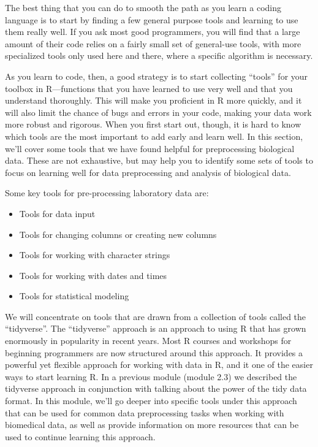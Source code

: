 \documentclass[]{tufte-book}
\providecommand{\tightlist}{%
  \setlength{\itemsep}{0pt}\setlength{\parskip}{0pt}}
\begin{document}
The best thing that you can do to smooth the path as you learn a coding language
is to start by finding a few general purpose tools and learning to use them
really well. If you ask most good programmers, you will find that a large
amount of their code relies on a fairly small set of general-use tools,
with more specialized tools only used here and there, where a specific
algorithm is necessary.

As you learn to code, then, a good strategy is to start collecting ``tools'' for
your toolbox in R---functions that you have learned to use very well and that
you understand thoroughly. This will make you proficient in R more quickly, and
it will also limit the chance of bugs and errors in your code, making your data
work more robust and rigorous. When you first start out, though, it is hard to
know which tools are the most important to add early and learn well. In this
section, we'll cover some tools that we have found helpful for
preprocessing biological data. These are not exhaustive, but may help you to
identify some sets of tools to focus on learning well for data preprocessing and
analysis of biological data.

Some key tools for pre-processing laboratory data are:

\begin{itemize}
\tightlist
\item
  Tools for data input
\item
  Tools for changing columns or creating new columns
\item
  Tools for working with character strings
\item
  Tools for working with dates and times
\item
  Tools for statistical modeling
\end{itemize}

We will concentrate on tools that are drawn from a collection of tools called the
``tidyverse''. The ``tidyverse'' approach is an approach to using R that has grown
enormously in popularity in recent years. Most R courses and workshops for
beginning programmers are now structured around this approach. It provides a
powerful yet flexible approach for working with data in R, and it one of the
easier ways to start learning R. In a previous module (module 2.3) we described
the tidyverse approach in conjunction with talking about the power of the tidy
data format. In this module, we'll go deeper into specific tools under this
approach that can be used for common data preprocessing tasks when working with
biomedical data, as well as provide information on more resources that can be
used to continue learning this approach.
\end{document}
